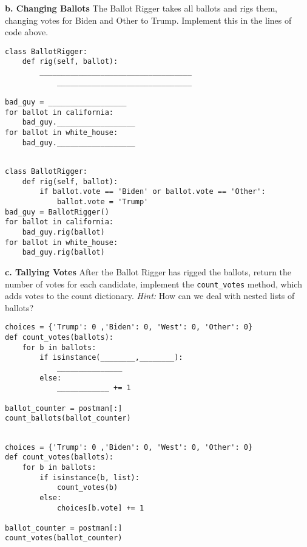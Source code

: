 \begin{blocksection}
\vspace{1\baselineskip}
\textbf{b. Changing Ballots}
The Ballot Rigger takes all ballots and rigs them, changing votes for Biden and Other to Trump. Implement this in the lines of code above.
\vspace{1\baselineskip}
\begin{lstlisting}
class BallotRigger:
    def rig(self, ballot):
        ___________________________________
        	_______________________________

bad_guy = __________________
for ballot in california:
    bad_guy.__________________
for ballot in white_house:
    bad_guy.__________________


\end{lstlisting}
\begin{solution}[1in]
\begin{lstlisting}
class BallotRigger:
    def rig(self, ballot):
        if ballot.vote == 'Biden' or ballot.vote == 'Other':
            ballot.vote = 'Trump'
bad_guy = BallotRigger()
for ballot in california:
    bad_guy.rig(ballot)
for ballot in white_house:
    bad_guy.rig(ballot)
\end{lstlisting}
\end{solution}
\vspace{1\baselineskip}
\textbf{c. Tallying Votes}
After the Ballot Rigger has rigged the ballots, return the number of votes for each candidate, implement the \lstinline{count_votes} method, which adds votes to the count dictionary.
\emph{Hint:} How can we deal with nested lists of ballots?
\vspace{1\baselineskip}
\begin{lstlisting}
choices = {'Trump': 0 ,'Biden': 0, 'West': 0, 'Other': 0}
def count_votes(ballots):
    for b in ballots:
        if isinstance(________,________):
            _______________
        else:
            ____________ += 1

ballot_counter = postman[:]
count_ballots(ballot_counter)


\end{lstlisting}
\begin{solution}[1in]
\begin{lstlisting}
choices = {'Trump': 0 ,'Biden': 0, 'West': 0, 'Other': 0}
def count_votes(ballots):
    for b in ballots:
        if isinstance(b, list):
            count_votes(b)
        else:
            choices[b.vote] += 1

ballot_counter = postman[:]
count_votes(ballot_counter)
\end{lstlisting}
\end{solution}
\end{blocksection}



